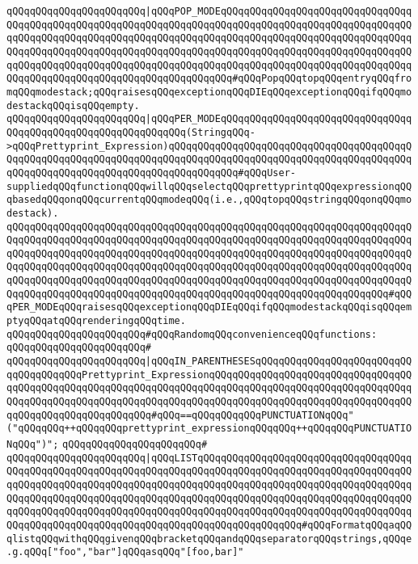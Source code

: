 \verb|qQQqqQQqqQQqqQQqqQQqqQQq|\verb#|qQQqPOP_MODEqQQqqQQqqQQqqQQqqQQqqQQqqQQqqQQqqQQqqQQqqQQqqQQqqQQqqQQqqQQqqQQqqQQqqQQqqQQqqQQqqQQqqQQqqQQqqQQqqQQqqQQqqQQqqQQqqQQqqQQqqQQqqQQqqQQqqQQqqQQqqQQqqQQqqQQqqQQqqQQqqQQqqQQqqQQqqQQqqQQqqQQqqQQqqQQqqQQqqQQqqQQqqQQqqQQqqQQqqQQqqQQqqQQqqQQqqQQqqQQqqQQqqQQqqQQqqQQqqQQqqQQqqQQqqQQqqQQqqQQqqQQqqQQqqQQqqQQqqQQqqQQqqQQqqQQqqQQqqQQqqQQqqQQqqQQqqQQqqQQqqQQqqQQqqQQq#\verb|#qQQqPopqQQqtopqQQqentryqQQqfromqQQqmodestack;qQQqraisesqQQqexceptionqQQqDIEqQQqexceptionqQQqifqQQqmodestackqQQqisqQQqempty.|\newline
\verb|qQQqqQQqqQQqqQQqqQQqqQQq|\verb#|qQQqPER_MODEqQQqqQQqqQQqqQQqqQQqqQQqqQQqqQQqqQQqqQQqqQQqqQQqqQQqqQQqqQQqqQQq(StringqQQq->qQQqPrettyprint_Expression)qQQqqQQqqQQqqQQqqQQqqQQqqQQqqQQqqQQqqQQqqQQqqQQqqQQqqQQqqQQqqQQqqQQqqQQqqQQqqQQqqQQqqQQqqQQqqQQqqQQqqQQqqQQqqQQqqQQqqQQqqQQqqQQqqQQqqQQqqQQqqQQqqQQqqQQq#\verb|#qQQqUser-suppliedqQQqfunctionqQQqwillqQQqselectqQQqprettyprintqQQqexpressionqQQqbasedqQQqonqQQqcurrentqQQqmodeqQQq(i.e.,qQQqtopqQQqstringqQQqonqQQqmodestack).|\newline
\verb|qQQqqQQqqQQqqQQqqQQqqQQqqQQqqQQqqQQqqQQqqQQqqQQqqQQqqQQqqQQqqQQqqQQqqQQqqQQqqQQqqQQqqQQqqQQqqQQqqQQqqQQqqQQqqQQqqQQqqQQqqQQqqQQqqQQqqQQqqQQqqQQqqQQqqQQqqQQqqQQqqQQqqQQqqQQqqQQqqQQqqQQqqQQqqQQqqQQqqQQqqQQqqQQqqQQqqQQqqQQqqQQqqQQqqQQqqQQqqQQqqQQqqQQqqQQqqQQqqQQqqQQqqQQqqQQqqQQqqQQqqQQqqQQqqQQqqQQqqQQqqQQqqQQqqQQqqQQqqQQqqQQqqQQqqQQqqQQqqQQqqQQqqQQqqQQqqQQqqQQqqQQqqQQqqQQqqQQqqQQqqQQqqQQqqQQqqQQqqQQqqQQqqQQqqQQqqQQq#qQQqPER_MODEqQQqraisesqQQqexceptionqQQqDIEqQQqifqQQqmodestackqQQqisqQQqemptyqQQqatqQQqrenderingqQQqtime.|\newline
\verb|qQQqqQQqqQQqqQQqqQQqqQQq#qQQqRandomqQQqconvenienceqQQqfunctions:|\newline
\verb|qQQqqQQqqQQqqQQqqQQqqQQq#|\newline
\verb|qQQqqQQqqQQqqQQqqQQqqQQq|\verb#|qQQqIN_PARENTHESESqQQqqQQqqQQqqQQqqQQqqQQqqQQqqQQqqQQqqQQqPrettyprint_ExpressionqQQqqQQqqQQqqQQqqQQqqQQqqQQqqQQqqQQqqQQqqQQqqQQqqQQqqQQqqQQqqQQqqQQqqQQqqQQqqQQqqQQqqQQqqQQqqQQqqQQqqQQqqQQqqQQqqQQqqQQqqQQqqQQqqQQqqQQqqQQqqQQqqQQqqQQqqQQqqQQqqQQqqQQqqQQqqQQqqQQqqQQqqQQqqQQqqQQqqQQq#\verb|#qQQq==qQQqqQQqqQQqPUNCTUATIONqQQq"("qQQqqQQq++qQQqqQQqprettyprint_expressionqQQqqQQq++qQQqqQQqPUNCTUATIONqQQq")";|\newline
\verb|qQQqqQQqqQQqqQQqqQQqqQQq#|\newline
\verb|qQQqqQQqqQQqqQQqqQQqqQQq|\verb#|qQQqLISTqQQqqQQqqQQqqQQqqQQqqQQqqQQqqQQqqQQqqQQqqQQqqQQqqQQqqQQqqQQqqQQqqQQqqQQqqQQqqQQqqQQqqQQqqQQqqQQqqQQqqQQqqQQqqQQqqQQqqQQqqQQqqQQqqQQqqQQqqQQqqQQqqQQqqQQqqQQqqQQqqQQqqQQqqQQqqQQqqQQqqQQqqQQqqQQqqQQqqQQqqQQqqQQqqQQqqQQqqQQqqQQqqQQqqQQqqQQqqQQqqQQqqQQqqQQqqQQqqQQqqQQqqQQqqQQqqQQqqQQqqQQqqQQqqQQqqQQqqQQqqQQqqQQqqQQqqQQqqQQqqQQqqQQqqQQqqQQqqQQqqQQqqQQqqQQqqQQqqQQqqQQqqQQq#\verb|#qQQqFormatqQQqaqQQqlistqQQqwithqQQqgivenqQQqbracketqQQqandqQQqseparatorqQQqstrings,qQQqe.g.qQQq["foo","bar"]qQQqasqQQq"[foo,bar]"|\newline

